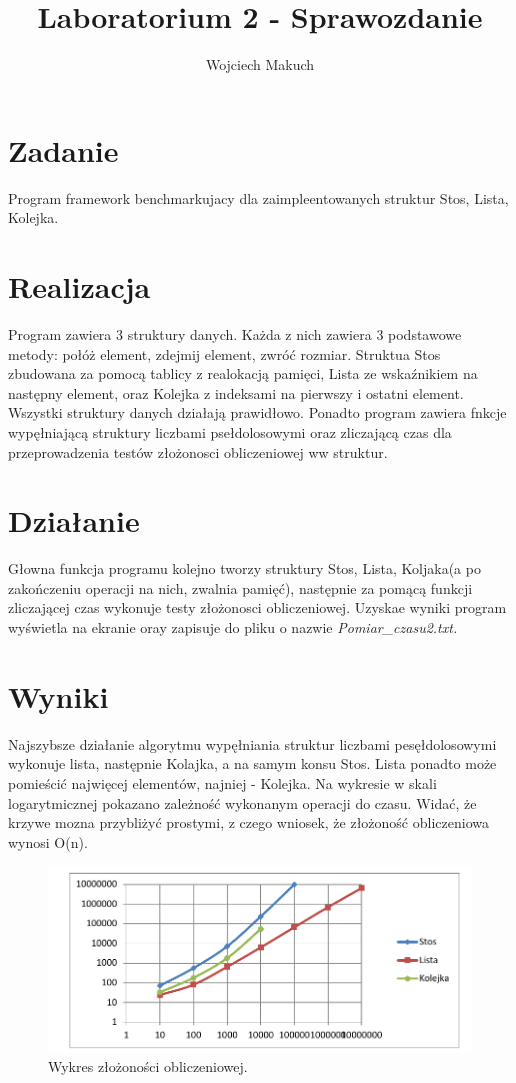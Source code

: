 

\title{Laboratorium 2 - Sprawozdanie}
\author{Wojciech Makuch}

	\maketitle
	\section{Zadanie}
	Program framework benchmarkujacy dla zaimpleentowanych struktur Stos, Lista, Kolejka.
	\section{Realizacja}
	Program zawiera 3 struktury danych. Każda z nich zawiera 3 podstawowe metody: połóż element, zdejmij element, zwróć rozmiar. Struktua Stos zbudowana za pomocą tablicy z realokacją pamięci, Lista ze wskaźnikiem na następny element, oraz Kolejka z indeksami na pierwszy i ostatni element. Wszystki struktury danych działają prawidłowo.
	Ponadto program zawiera fnkcje wypęłniającą struktury liczbami psełdolosowymi oraz zliczającą czas dla przeprowadzenia testów złożonosci obliczeniowej ww struktur.
	\section{Działanie}
	Głowna funkcja programu kolejno tworzy struktury Stos, Lista, Koljaka(a po zakończeniu operacji na nich, zwalnia pamięć), następnie za pomącą funkcji zliczającej czas wykonuje testy złożonosci obliczeniowej. Uzyskae wyniki program wyświetla na ekranie oray zapisuje do pliku o nazwie \textsl{Pomiar\_czasu2.txt.}
	\section{Wyniki}
	Najszybsze działanie algorytmu wypęłniania struktur liczbami pesęłdolosowymi wykonuje lista, następnie Kolajka, a na samym konsu Stos. Lista ponadto może pomieścić najwięcej elementów, najniej - Kolejka. Na wykresie w skali logarytmicznej pokazano zależność wykonanym operacji do czasu. Widać, że krzywe mozna przybliżyć prostymi, z czego wniosek, że złożoność obliczeniowa wynosi O(n).  
	 \begin{figure}
	 	\centering
		\includegraphics[width=14cm]{Wykres.pdf}
		\caption{Wykres złożoności obliczeniowej.}
	 \end{figure}
